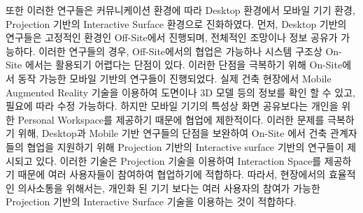 또한 이러한 연구들은 커뮤니케이션 환경에 따라 Desktop 환경에서 모바일 기기 환경, Projection 기반의 Interactive Surface 환경으로 진화하였다. 먼저, Desktop 기반의 연구\cite{dong_collaborative_2013,golparvar-fard_d4ar4-dimensional_2009,lin_using_2014}들은 고정적인 환경인 Off-Site에서 진행되며, 전체적인 조망이나 정보 공유가 가능하다. 이러한 연구들의 경우, Off-Site에서의 협업은 가능하나 시스템 구조상 On-Site 에서는 활용되기 어렵다는 단점이 있다. 이러한 단점을 극복하기 위해 On-Site에서 동작 가능한 모바일 기반의 연구들\cite{saidi_value_????,kwon_defect_2014,cote_augmented_2013,irizarry_ambient_2014,hammad_distributed_2009,bae_high-precision_2013,ammari_collaborative_2014,williams_bim2mar:_2015}이 진행되었다. 실제 건축 현장에서 Mobile Augmented Reality 기술을 이용하여 도면이나 3D 모델 등의 정보를 확인 할 수 있고, 필요에 따라 수정 가능하다. 하지만 모바일 기기의 특성상 화면 공유보다는 개인을 위한 Personal Workspace를 제공하기 때문에 협업에 제한적이다. 이러한 문제를 극복하기 위해, Desktop과 Mobile 기반 연구들의 단점을 보완하여 On-Site 에서 건축 관계자들의 협업을 지원하기 위해 Projection 기반의 Interactive surface 기반의 연구들\cite{ishii_augmented_2002,wagner_building_2012,song_penlight:_2009}이 제시되고 있다. 이러한 기술은 Projection 기술을 이용하여 Interaction Space를 제공하기 때문에 여러 사용자들이 참여하여 협업하기에 적합하다. 따라서, 현장에서의 효율적인 의사소통을 위해서는, 개인화 된 기기 보다는 여러 사용자의 참여가 가능한 Projection 기반의 Interactive Surface 기술을 이용하는 것이 적합하다.





